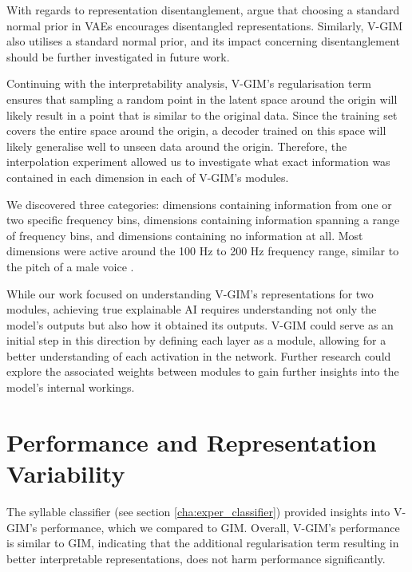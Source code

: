 	With regards to representation disentanglement, \cite{burgessUnderstandingDisentanglingBeta2018} argue that choosing a standard normal prior in VAEs encourages disentangled representations. Similarly, V-GIM also utilises a standard normal prior, and its impact concerning disentanglement should be further investigated in future work.
	
	

	Continuing with the interpretability analysis, V-GIM's regularisation term ensures that sampling a random point in the latent space around the origin will likely result in a point that is similar to the original data. Since the training set covers the entire space around the origin, a decoder trained on this space will likely generalise well to unseen data around the origin. Therefore, the interpolation experiment allowed us to investigate what exact information was contained in each dimension in each of V-GIM's modules. 
	
	We discovered three categories: dimensions containing information from one or two specific frequency bins, dimensions containing information spanning a range of frequency bins, and dimensions containing no information at all. Most dimensions were active around the 100 Hz to 200 Hz frequency range, similar to the pitch of a male voice \citep{rePreferencesVeryLow2012}.
	
	While our work focused on understanding V-GIM's representations for two modules, achieving true explainable AI requires understanding not only the model's outputs but also how it obtained its outputs. V-GIM could serve as an initial step in this direction by defining each layer as a module, allowing for a better understanding of each activation in the network. Further research could explore the associated weights between modules to gain further insights into the model's internal workings.

\section{Performance and Representation Variability} 
	The syllable classifier (see section \ref{cha:exper_classifier}) provided insights into V-GIM's performance, which we compared to GIM. Overall, V-GIM's performance is similar to GIM, indicating that the additional regularisation term resulting in better interpretable representations, does not harm performance significantly.
	
